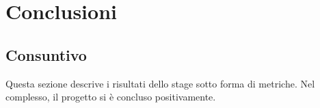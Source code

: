 
\chapter{Conclusioni}
\label{cap:conclusioni}

\section{Consuntivo}
Questa sezione descrive i risultati dello stage sotto forma di metriche. Nel complesso, il progetto si è concluso positivamente.

